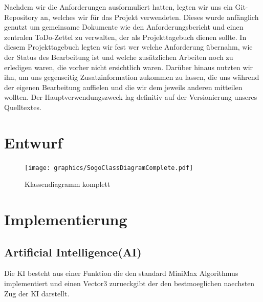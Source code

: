 \documentclass[a4paper]{scrartcl}
\begin{document}
Nachdem wir die Anforderungen ausformuliert hatten, legten wir uns ein Git-Repository an, welches wir für das Projekt verwendeten. Dieses wurde anfänglich genutzt um gemeinsame Dokumente wie den Anforderungsbericht und einen zentralen ToDo-Zettel zu verwalten, der als Projekttagebuch dienen sollte. In diesem Projekttagebuch legten wir fest wer welche Anforderung übernahm, wie der Status des Bearbeitung ist und welche zusätzlichen Arbeiten noch zu erledigen waren, die vorher nicht ersichtlich waren. Darüber hinaus nutzten wir ihn, um uns gegenseitig Zusatzinformation zukommen zu lassen, die uns während der eigenen Bearbeitung auffielen und die wir dem jeweils anderen mitteilen wollten. Der Hauptverwendungszweck lag definitiv auf der Versionierung unseres Quelltextes.

\section{Entwurf}\label{ch:Entwurf}

\begin{figure}[H]
 \centering
 \texttt{[image: graphics/SogoClassDiagramComplete.pdf]}
 \caption{Klassendiagramm komplett}
 \label{fig:ClassdiagramComplete}
\end{figure}

\section{Implementierung}\label{ch:Implementierung}


\subsection{Artificial Intelligence(AI)}\label{ch:AI}
Die KI besteht aus einer Funktion die den standard MiniMax Algorithmus implementiert und einen Vector3 zurueckgibt der den bestmoeglichen naechsten Zug der KI darstellt.
\end{document}
